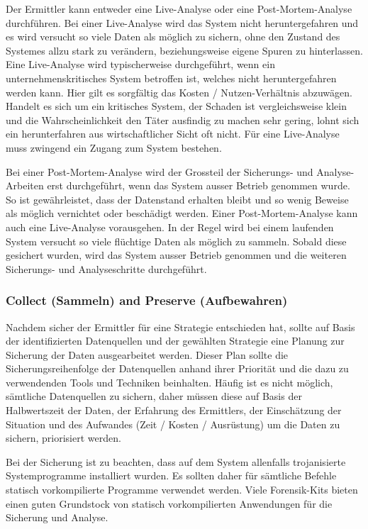 Der Ermittler kann entweder eine Live-Analyse oder eine Post-Mortem-Analyse durchführen. Bei einer Live-Analyse wird das System nicht heruntergefahren und es wird versucht so viele Daten als möglich zu sichern, ohne den Zustand des Systemes allzu stark zu verändern, beziehungsweise eigene Spuren zu hinterlassen. Eine Live-Analyse wird typischerweise durchgeführt, wenn ein unternehmenskritisches System betroffen ist, welches nicht heruntergefahren werden kann. Hier gilt es sorgfältig das Kosten / Nutzen-Verhältnis abzuwägen. Handelt es sich um ein kritisches System, der Schaden ist vergleichsweise klein und die Wahrscheinlichkeit den Täter ausfindig zu machen sehr gering, lohnt sich ein herunterfahren aus wirtschaftlicher Sicht oft nicht. Für eine Live-Analyse muss zwingend ein Zugang zum System bestehen.

Bei einer Post-Mortem-Analyse wird der Grossteil der Sicherungs- und Analyse-Arbeiten erst durchgeführt, wenn das System ausser Betrieb genommen wurde. So ist gewährleistet, dass der Datenstand erhalten bleibt und so wenig Beweise als möglich vernichtet oder beschädigt werden. Einer Post-Mortem-Analyse kann auch eine Live-Analyse vorausgehen. In der Regel wird bei einem laufenden System versucht so viele flüchtige Daten als möglich zu sammeln. Sobald diese gesichert wurden, wird das System ausser Betrieb genommen und die weiteren Sicherungs- und Analyseschritte durchgeführt.

\subsubsection{Collect (Sammeln) and Preserve (Aufbewahren)} \label{subsubsec:FA:Secure:CollectPreserve}
Nachdem sicher der Ermittler für eine Strategie entschieden hat, sollte auf Basis der identifizierten Datenquellen und der gewählten Strategie eine Planung zur Sicherung der Daten ausgearbeitet werden. Dieser Plan sollte die Sicherungsreihenfolge der Datenquellen anhand ihrer Priorität und die dazu zu verwendenden Tools und Techniken beinhalten. Häufig ist es nicht möglich, sämtliche Datenquellen zu sichern, daher müssen diese auf Basis der Halbwertszeit der Daten, der Erfahrung des Ermittlers, der Einschätzung der Situation und des Aufwandes (Zeit / Kosten / Ausrüstung) um die Daten zu sichern,  priorisiert werden.

Bei der Sicherung ist zu beachten, dass auf dem System allenfalls trojanisierte Systemprogramme installiert wurden. Es sollten daher für sämtliche Befehle statisch vorkompilierte  Programme verwendet werden. Viele Forensik-Kits bieten einen guten Grundstock von statisch vorkompilierten Anwendungen für die Sicherung und Analyse.

